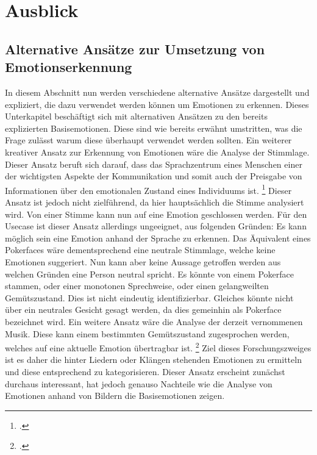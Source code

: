 \documentclass[12pt, a4paper]{scrbook}
\begin{document}
\chapter{Ausblick}


\section{Alternative Ansätze zur Umsetzung von Emotionserkennung}

In diesem Abschnitt nun werden verschiedene alternative Ansätze dargestellt und expliziert, die dazu verwendet werden können um Emotionen zu erkennen.
Dieses Unterkapitel beschäftigt sich mit alternativen Ansätzen zu den bereits explizierten Basisemotionen. Diese sind wie bereits erwähnt umstritten, was die Frage zulässt warum diese überhaupt
verwendet werden sollten. Ein weiterer kreativer Ansatz zur Erkennung von Emotionen wäre die Analyse der Stimmlage.
Dieser Ansatz beruft sich darauf, dass das Sprachzentrum eines Menschen einer der wichtigsten Aspekte der Kommunikation und somit auch der Preisgabe von Informationen über den emotionalen Zustand eines Individuums ist.
\footcite[Vgl. ][Abstract]{EmotionInSpeech}
Dieser Ansatz ist jedoch nicht zielführend, da hier hauptsächlich die Stimme analysiert wird. Von einer Stimme kann nun auf eine Emotion geschlossen werden. Für den Usecase ist dieser Ansatz allerdings ungeeignet, aus folgenden Gründen:
\newline
Es kann möglich sein eine Emotion anhand der Sprache zu erkennen. Das Äquivalent eines Pokerfaces wäre dementsprechend eine neutrale Stimmlage, welche keine Emotionen suggeriert. Nun kann aber keine Aussage getroffen werden aus welchen Gründen eine Person neutral spricht. Es könnte von einem Pokerface stammen, oder einer monotonen Sprechweise, oder einen gelangweilten Gemütszustand. Dies ist nicht eindeutig identifizierbar. Gleiches könnte nicht über ein neutrales Gesicht gesagt werden, da dies gemeinhin als Pokerface bezeichnet wird. %
Ein weitere Ansatz wäre die Analyse der derzeit vernommenen Musik. Diese kann einem bestimmten Gemütszustand zugesprochen werden, welches auf eine aktuelle Emotion übertragbar ist.
\footcite[Vgl.][1]{MusicEmotion}
Ziel dieses Forschungszweiges ist es daher die hinter Liedern oder Klängen stehenden Emotionen zu ermitteln und diese entsprechend zu kategorisieren.
Dieser Ansatz erscheint zunächst durchaus interessant, hat jedoch genauso Nachteile wie die Analyse von Emotionen anhand von Bildern die Basisemotionen zeigen. %
\end{document}
